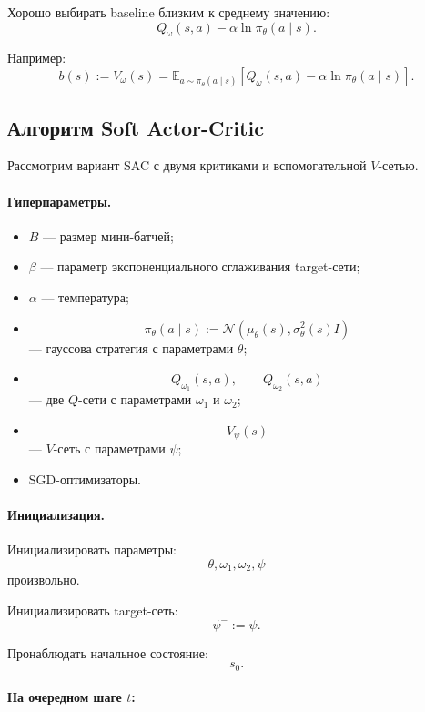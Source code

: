 \documentclass[12pt,a4paper]{article}
\begin{document}
Хорошо выбирать baseline близким к среднему значению:
\[
Q_\omega(s,a)
-
\alpha\ln\pi_\theta(a\mid s).
\]

Например:
\[
b(s)
:=
V_\omega(s)
=
\mathbb E_{a\sim\pi_\theta(a\mid s)}
\left[
Q_\omega(s,a)
-
\alpha\ln\pi_\theta(a\mid s)
\right].
\]

\subsection{Алгоритм Soft Actor-Critic}

Рассмотрим вариант SAC с двумя критиками и вспомогательной $V$-сетью.

\paragraph{Гиперпараметры.}

\begin{itemize}
    \item $B$ --- размер мини-батчей;
    \item $\beta$ --- параметр экспоненциального сглаживания target-сети;
    \item $\alpha$ --- температура;
    \item
    \[
    \pi_\theta(a\mid s)
    :=
    \mathcal N
    \left(
    \mu_\theta(s),
    \sigma_\theta^2(s)I
    \right)
    \]
    --- гауссова стратегия с параметрами $\theta$;
    \item
    \[
    Q_{\omega_1}(s,a),
    \qquad
    Q_{\omega_2}(s,a)
    \]
    --- две $Q$-сети с параметрами $\omega_1$ и $\omega_2$;
    \item
    \[
    V_\psi(s)
    \]
    --- $V$-сеть с параметрами $\psi$;
    \item SGD-оптимизаторы.
\end{itemize}

\paragraph{Инициализация.}

Инициализировать параметры:
\[
\theta,\omega_1,\omega_2,\psi
\]
произвольно.

Инициализировать target-сеть:
\[
\psi^-:=\psi.
\]

Пронаблюдать начальное состояние:
\[
s_0.
\]

\paragraph{На очередном шаге $t$:}
\end{document}
